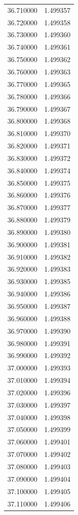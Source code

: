 \begin{tabular}{rr}
36.710000 & 1.499357 \\
36.720000 & 1.499358 \\
36.730000 & 1.499360 \\
36.740000 & 1.499361 \\
36.750000 & 1.499362 \\
36.760000 & 1.499363 \\
36.770000 & 1.499365 \\
36.780000 & 1.499366 \\
36.790000 & 1.499367 \\
36.800000 & 1.499368 \\
36.810000 & 1.499370 \\
36.820000 & 1.499371 \\
36.830000 & 1.499372 \\
36.840000 & 1.499374 \\
36.850000 & 1.499375 \\
36.860000 & 1.499376 \\
36.870000 & 1.499377 \\
36.880000 & 1.499379 \\
36.890000 & 1.499380 \\
36.900000 & 1.499381 \\
36.910000 & 1.499382 \\
36.920000 & 1.499383 \\
36.930000 & 1.499385 \\
36.940000 & 1.499386 \\
36.950000 & 1.499387 \\
36.960000 & 1.499388 \\
36.970000 & 1.499390 \\
36.980000 & 1.499391 \\
36.990000 & 1.499392 \\
37.000000 & 1.499393 \\
37.010000 & 1.499394 \\
37.020000 & 1.499396 \\
37.030000 & 1.499397 \\
37.040000 & 1.499398 \\
37.050000 & 1.499399 \\
37.060000 & 1.499401 \\
37.070000 & 1.499402 \\
37.080000 & 1.499403 \\
37.090000 & 1.499404 \\
37.100000 & 1.499405 \\
37.110000 & 1.499406 \\

\end{tabular}
